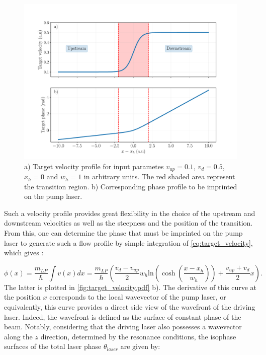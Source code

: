 \begin{figure}[h]
    \centering
    \includegraphics[width=1\textwidth]{chap_custom_st/fig/target_velocity.pdf}
    \caption{ a) Target velocity profile for input parametes $v_{up}=0.1$, $v_{d}=0.5$, $x_h=0$ and $w_h=1$ in arbitrary units. The red shaded area represent the 
    transition region. b) Corresponding phase profile to be imprinted on the pump laser.}
    \label{fig:target_velocity.pdf}
\end{figure}

Such a velocity profile provides great flexibility in the choice of the upstream and downstream velocities as well as the steepness and the position of the transition. From this, one can determine the phase that must be imprinted on the pump laser to generate such a flow profile by simple integration of \autoref{eq:target_velocity}, which gives :

\begin{equation}
    \phi(x) = \dfrac{m_{LP}}{\hbar} \int v(x) dx = \dfrac{m_{LP}}{\hbar} \left( \dfrac{v_{d}-v_{up}}{2} w_h \mathrm{ln}(\cosh(\dfrac{x-x_h}{w_h}))+\dfrac{v_{up}+v_{d}}{2}x \right).
    \label{eq:target_phase_profile}
\end{equation}
The latter is plotted in \autoref{fig:target_velocity.pdf} b). The derivative of this curve at the position $x$ corresponds to the local wavevector of the pump laser, or equivalently, this curve provides a direct side view of the wavefront of the driving laser.
 Indeed, the wavefront is defined as the surface of constant phase of the beam. Notably, considering that the driving laser also possesses a wavevector along the $z$ direction, determined by the resonance conditions, the isophase surfaces of the total laser phase $\theta_{laser}$ are given by:  

